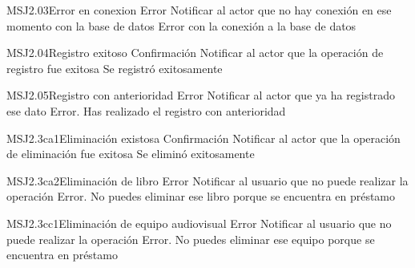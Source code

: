 	\begin{Message}{MSJ2.03}{Error en conexion}
		\MSGitem[Tipo:] Error	
		\MSGitem[Objetivo: ] Notificar al actor que no hay conexión en ese momento con la base de datos
		\MSGitem[Redacción: ] Error con la conexión a la base de datos
	\end{Message}
	
	\begin{Message}{MSJ2.04}{Registro exitoso}
		\MSGitem[Tipo:] Confirmación	
		\MSGitem[Objetivo: ] Notificar al actor que la operación de registro fue exitosa
		\MSGitem[Redacción: ] Se registró exitosamente
	\end{Message}
	
	\begin{Message}{MSJ2.05}{Registro con anterioridad}
		\MSGitem[Tipo:] Error	
		\MSGitem[Objetivo: ] Notificar al actor que ya ha registrado ese dato
		\MSGitem[Redacción: ] Error. Has realizado el registro con anterioridad
	\end{Message}
	
	\begin{Message}{MSJ2.3ca1}{Eliminación existosa}
		\MSGitem[Tipo:] Confirmación	
		\MSGitem[Objetivo: ] Notificar al actor que la operación de eliminación fue exitosa
		\MSGitem[Redacción: ] Se eliminó exitosamente
	\end{Message}
	
	\begin{Message}{MSJ2.3ca2}{Eliminación de libro}
		\MSGitem[Tipo:] Error	
		\MSGitem[Objetivo: ] Notificar al usuario que no puede realizar la operación
		\MSGitem[Redacción: ] Error. No puedes eliminar ese libro porque se encuentra en préstamo
	\end{Message}
	
	\begin{Message}{MSJ2.3cc1}{Eliminación de equipo audiovisual}
		\MSGitem[Tipo:] Error	
		\MSGitem[Objetivo: ] Notificar al usuario que no puede realizar la operación
		\MSGitem[Redacción: ] Error. No puedes eliminar ese equipo porque se encuentra en préstamo
	\end{Message}
	
